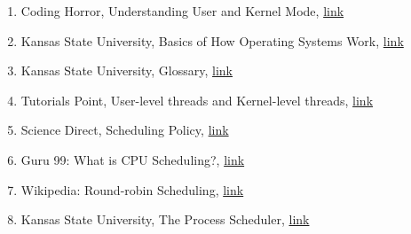 \documentclass[12pt]{article}
\begin{document}
\begin{enumerate}[1)]
    \item Coding Horror, Understanding User and Kernel Mode, \href{https://blog.codinghorror.com/understanding-user-and-kernel-mode/}{link}
    \item Kansas State University, Basics of How Operating Systems Work, \href{http://faculty.salina.k-state.edu/tim/ossg/Introduction/OSworking.html#:~:text=Interrupts%20are%20signals%20sent%20to,part%20of%20the%20operating%20system.&text=Hardware%20Interupts%20are%20generated%20by,some%20attention%20from%20the%20OS.}{link}
    \item Kansas State University, Glossary, \href{http://faculty.salina.k-state.edu/tim/ossg/glossary.html#term-context-switch}{link}
    \item Tutorials Point, User-level threads and Kernel-level threads, \href{https://www.tutorialspoint.com/user-level-threads-and-kernel-level-threads}{link}
    \item Science Direct, Scheduling Policy, \href{https://www.sciencedirect.com/topics/computer-science/scheduling-policy#:~:text=Scheduling%20policies%20are%20algorithms%20for,nature%20of%20applications%20%5B1%5D.}{link}
    \item Guru 99: What is CPU Scheduling?, \href{https://www.guru99.com/cpu-scheduling-algorithms.html#8}{link}
    \item Wikipedia: Round-robin Scheduling, \href{https://en.wikipedia.org/wiki/Round-robin_scheduling}{link}
    \item Kansas State University, The Process Scheduler, \href{http://faculty.salina.k-state.edu/tim/ossg/Process/scheduler/scheduler.html#:~:text=CPU%20Bound%20processes%20are%20ones,the%20life%20of%20the%20process.}{link}
\end{enumerate}
\end{document}
